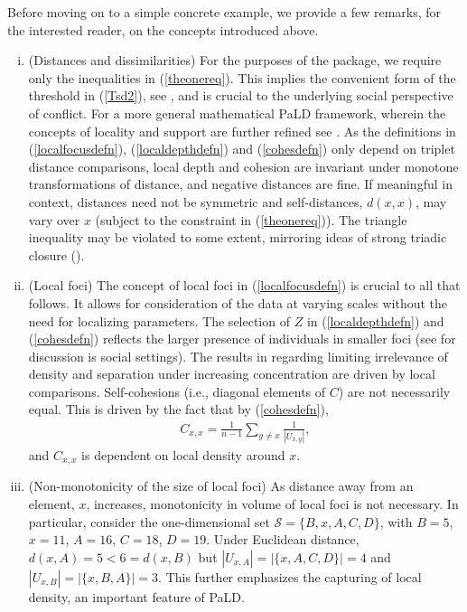Before moving on to a simple concrete example, we provide a few remarks, for the interested reader, on the concepts introduced above.

\begin{enumerate}[(i)]
\item (Distances and dissimilarities) For the purposes of the package, we require only the inequalities in (\ref{theonereq}). This implies the convenient form of the threshold in (\ref{Tsd2}), see \cite{berenhaut2022social}, and is crucial to the underlying social perspective of conflict. For a more general mathematical PaLD framework, wherein the concepts of locality and support are further refined see \cite{berenhaut2024generalized}. As the definitions in (\ref{localfocusdefn}), (\ref{localdepthdefn}) and (\ref{cohesdefn}) only depend on triplet distance comparisons, local depth and cohesion are invariant under monotone transformations of distance, and negative distances are fine. If meaningful in context, distances need not be symmetric and self-distances, $d(x,x)$, may vary over $x$ (subject to the constraint in (\ref{theonereq})). The triangle inequality may be violated to some extent, mirroring ideas of strong triadic closure (\cite{granovetter1973strength}).

\item (Local foci) The concept of local foci in (\ref{localfocusdefn}) is crucial to all that follows. It allows for consideration of the data at varying scales without the need for localizing parameters. The selection of $Z$ in (\ref{localdepthdefn}) and (\ref{cohesdefn}) reflects the larger presence of individuals in smaller foci (see \cite{feld1981focused} for discussion is social settings). The results in \cite{berenhaut2022social} regarding limiting irrelevance of density and separation under increasing concentration are driven by local comparisons. Self-cohesions (i.e., diagonal elements of $C$) are not necessarily equal. This is driven by the fact that by (\ref{cohesdefn}),
\begin{eqnarray}
C_{x,x}=\frac{1}{n-1} \sum_{y\neq x} \frac{1}{|{U_{x,y}}|},
\end{eqnarray}
\noindent and $C_{x,x}$ is dependent on local density around $x$.

\item (Non-monotonicity of the size of local foci) As distance away from an element, $x$, increases, monotonicity in volume of local foci is not necessary. In particular, consider the one-dimensional set $\mathcal{S}=\{B,x,A,C,D\}$, with $B=5$, $x=11$, $A=16$, $C=18$, $D=19$. Under Euclidean distance, $d(x,A)=5<6=d(x,B)$ but $|U_{x,A}|=|\{x,A,C,D\}|=4$ and $|U_{x,B}|=|\{x,B,A\}|=3$. This further emphasizes the capturing of local density, an important feature of PaLD.


\end{enumerate}
